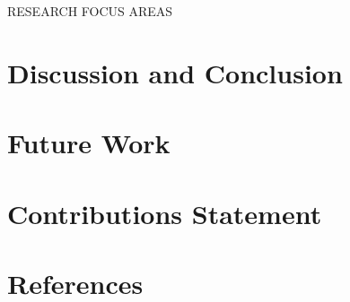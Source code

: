 \documentclass{article}
\begin{document}
RESEARCH FOCUS AREAS

\section{Discussion and Conclusion}

\section{Future Work}

\section{Contributions Statement}



\section*{References}
\end{document}
